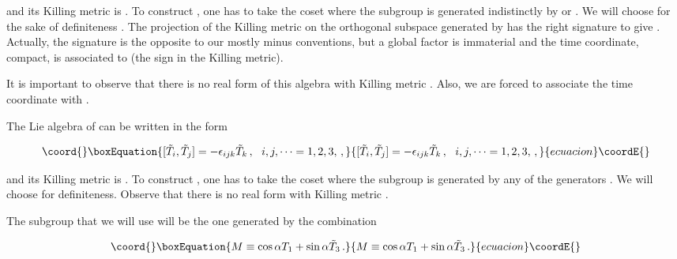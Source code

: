 \documentclass[12pt,a4paper]{article}
\begin{document}
\noindent
and its Killing metric is \coordHE{}. To construct
\coordHE{}, one has to take the coset \coordHE{} where the
subgroup \coordHE{} is generated indistinctly by \coordHE{} or \coordHE{}. We
will choose for the sake of definiteness \coordHE{}. The projection of
the Killing metric on the orthogonal subspace generated by
\coordHE{}  \coordHE{} has the right signature to give
\coordHE{}. Actually, the signature is the opposite to our mostly minus
conventions, but a global factor is immaterial and the time
coordinate, compact, is associated to \coordHE{} (the \myHighlight{$-$}\coordHE{} sign in the
Killing metric).

It is important to observe that there is no real form of this algebra
with Killing metric \coordHE{}. Also, we are forced to
associate the time coordinate with \coordHE{}.
 
The Lie algebra of \coordHE{} can be written in the form

\begin{equation}\coord{}\boxEquation{
[\tilde{T}_{i},\tilde{T}_{j}]=-\epsilon_{ijk}\tilde{T}_{k}\, ,
\,\,\,\,
i,j,\cdots=1,2,3,\, ,   
}{
[\tilde{T}_{i},\tilde{T}_{j}]=-\epsilon_{ijk}\tilde{T}_{k}\, ,
\,\,\,\,
i,j,\cdots=1,2,3,\, ,   
}{ecuacion}\coordE{}\end{equation}

\noindent
and its Killing metric is \coordHE{}. To construct
\coordHE{}, one has to take the coset \coordHE{} where the subgroup
\coordHE{} is generated by any of the generators \coordHE{}. We will
choose \coordHE{} for definiteness. Observe that there is no real form
with Killing metric \coordHE{}.

The subgroup \coordHE{} that we will use will be the one generated by the
combination

\begin{equation}\coord{}\boxEquation{
M \equiv \cos{\alpha} T_{1} +\sin{\alpha}\tilde{T}_{3}\, .  
}{
M \equiv \cos{\alpha} T_{1} +\sin{\alpha}\tilde{T}_{3}\, .  
}{ecuacion}\coordE{}\end{equation}
\end{document}
